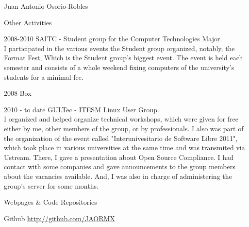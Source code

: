 \documentclass[spanish,10pt,letterpaper]{article}
\begin{document}
\begin{cv}{Juan Antonio Osorio-Robles}
	\begin{cvlist}{Other Activities}
		\item [2008-2010] SAITC - Student group for the Computer Technologies Major.\\
			I participated in the various events the Student group organized, notably, the Format Fest, Which is the Student group's biggest event. The event is held each semester and consists of a whole weekend fixing computers of the university's students for a minimal fee. 
		\item [2008] Box
		\item [2010 - to date] GULTec - ITESM Linux User Group.\\
			I organized and helped organize technical workshops, which were given for free either by me, other members of the group, or by professionals. I also was part of the organization of the event called "Interunivesitario de Software Libre 2011", which took place in various universities at the same time and was transmited via Ustream. There, I gave a presentation about Open Source Compliance. I had contact with some companies and gave announcements to the group members about the vacancies available. And, I was also in charge of administering the group's server for some months.
	\end{cvlist}

	\begin{cvlist}{Webpages \& Code Repositories}
		\item [Github] \href{http://github.com/JAORMX}{http://github.com/JAORMX}
	\end{cvlist}
	
	
	
\end{cv}


\end{document}

